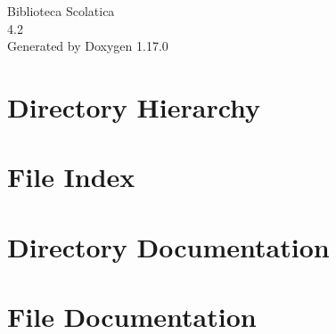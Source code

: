 \documentclass[twoside]{book}
\newcommand{\+}{\discretionary{\mbox{\scriptsize$\hookleftarrow$}}{}{}}
\newcommand{\clearemptydoublepage}{%
    \newpage{\pagestyle{empty}\cleardoublepage}%
  }
\begin{document}
  \raggedbottom
    \hypersetup{pageanchor=false,
                bookmarksnumbered=true,
                pdfencoding=unicode
               }
  \begin{titlepage}
  \vspace*{7cm}
  \begin{center}%
  {\Large Biblioteca Scolatica}\\
  [1ex]\large 4.\+2 \\
  \vspace*{1cm}
  {\large Generated by Doxygen 1.17.0}\\
  \end{center}
  \end{titlepage}
  \clearemptydoublepage
  \tableofcontents
  \clearemptydoublepage
  \hypersetup{pageanchor=true}
\chapter{Directory Hierarchy}

\chapter{File Index}

\chapter{Directory Documentation}



\chapter{File Documentation}


  \backmatter
  \newpage
  \clearemptydoublepage
  \printindex
\end{document}
